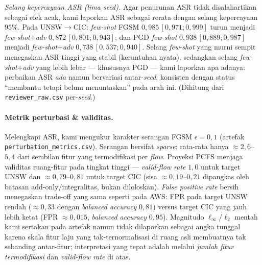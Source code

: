 \documentclass[11pt,a4paper]{article}
\begin{document}
\noindent\emph{Selang kepercayaan ASR (lima \emph{seed}).} Agar penurunan ASR tidak
disalahartikan sebagai efek acak, kami laporkan ASR sebagai rerata dengan selang
kepercayaan $95\%$. Pada UNSW$\rightarrow$CIC: \emph{few-shot} FGSM
$0{,}985\,[0{,}971;0{,}999]$ turun menjadi \emph{few-shot$+$adv}
$0{,}872\,[0{,}801;0{,}943]$; dan PGD \emph{few-shot} $0{,}938\,[0{,}889;0{,}987]$
menjadi \emph{few-shot$+$adv} $0{,}738\,[0{,}537;0{,}940]$. Selang \emph{few-shot}
yang murni sempit menegaskan ASR tinggi yang stabil (keruntuhan nyata), sedangkan
selang \emph{few-shot$+$adv} yang lebih lebar --- khususnya PGD --- kami laporkan apa
adanya: perbaikan ASR \emph{ada} namun bervariasi antar-\emph{seed}, konsisten dengan
status ``membantu tetapi belum menuntaskan'' pada arah ini. (Dihitung dari
\texttt{reviewer\_raw.csv} per-\emph{seed}.)

\paragraph{Metrik perturbasi \& validitas.} Melengkapi ASR, kami mengukur karakter
serangan FGSM $\epsilon{=}0{,}1$ (artefak \texttt{perturbation\_metrics.csv}).
Serangan bersifat \emph{sparse}: rata-rata hanya $\approx 2{,}6$--$5{,}4$ dari
sembilan fitur yang termodifikasi per \emph{flow}. Proyeksi PCFS menjaga validitas
ruang-fitur pada tingkat tinggi --- \emph{valid-flow rate} $1{,}0$ untuk target UNSW
dan $\approx0{,}79$--$0{,}81$ untuk target CIC (sisa $\approx0{,}19$--$0{,}21$
dipangkas oleh batasan add-only/integralitas, bukan diloloskan). \emph{False
positive rate} bersih menegaskan trade-off yang sama seperti pada AWS: FPR pada
target UNSW rendah ($\approx0{,}33$ dengan \emph{balanced accuracy} $0{,}81$) versus
target CIC yang jauh lebih ketat (FPR $\approx0{,}015$, \emph{balanced accuracy}
$0{,}95$). Magnitudo $\ell_\infty$/$\ell_2$ mentah kami sertakan pada artefak namun
tidak dilaporkan sebagai angka tunggal karena skala fitur laju yang tak-ternormalisasi
di ruang asli membuatnya tak sebanding antar-fitur; interpretasi yang tepat adalah
melalui \emph{jumlah fitur termodifikasi} dan \emph{valid-flow rate} di atas.
\end{document}
